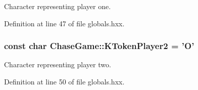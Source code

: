 Character representing player one. 



Definition at line 47 of file globals.\-hxx.

\hypertarget{namespace_chase_game_ae27343407c21a8d6e3cf26b736bd5527}{
\subsubsection[{K\-Token\-Player2}]{\setlength{\rightskip}{0pt plus 5cm}const char Chase\-Game\-::\-K\-Token\-Player2 = 'O'}}\label{namespace_chase_game_ae27343407c21a8d6e3cf26b736bd5527}


Character representing player two. 



Definition at line 50 of file globals.\-hxx.

